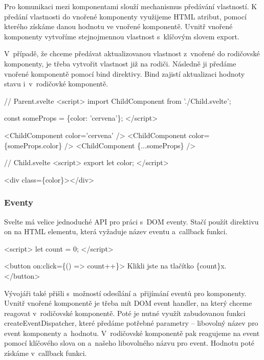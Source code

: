 Pro komunikaci mezi komponentami slouží mechanismus předávání vlastností. 
K předání vlastnosti do vnořené komponenty využijeme HTML atribut, pomocí kterého získáme danou hodnotu ve vnořené komponentě.  
Uvnitř vnořené komponenty vytvoříme stejnojmennou vlastnost s~klíčovým slovem export.

V~případě, že chceme předávat aktualizovanou vlastnost z~vnořené do rodičovské komponenty, je třeba vytvořit vlastnost již na rodiči. 
Následně ji předáme vnořené komponentě pomocí bind direktivy. Bind zajistí aktualizaci hodnoty stavu i~v~rodičovké komponentě.\cite{svelte}

\begin{prog}
// Parent.svelte
<script>
  import ChildComponent from './Child.svelte';

  const someProps = \{color: 'cervena'\};
</script>

<ChildComponent color='cervena' />
<ChildComponent color=\{someProps.color\} />
<ChildComponent \{...someProps\} />

// Child.svelte
<script>
  export let color;
</script>

<div class=\{color\}></div>
\end{prog}

\subsubsection{Eventy} %

Svelte má velice jednoduché API pro práci s~DOM eventy. Stačí použít direktivu on na HTML elementu, která vyžaduje název eventu a~callback funkci.

\begin{prog}
<script>
  let count = 0;
</script>

<button on:click=\{() => count++\}>
  Klikli jste na tlačítko \{count\}x.
</button>
\end{prog}

Vývojáři také přišli s~možností odesílání a~přijímání eventů pro komponenty. 
Uvnitř vnořené komponentě je třeba mít DOM event handler, na který chceme reagovat v~rodičovské komponentě. 
Poté je nutné využít zabudovanou funkci createEventDispatcher, které předáme potřebné parametry -- libovolný název pro event komponenty a~hodnotu. 
V~rodičovské komponentě pak reagujeme na event pomocí klíčového slova on a~našeho libovolného názvu pro event. Hodnotu poté získáme v~callback funkci.\cite{sveltehandbook,svelte}

